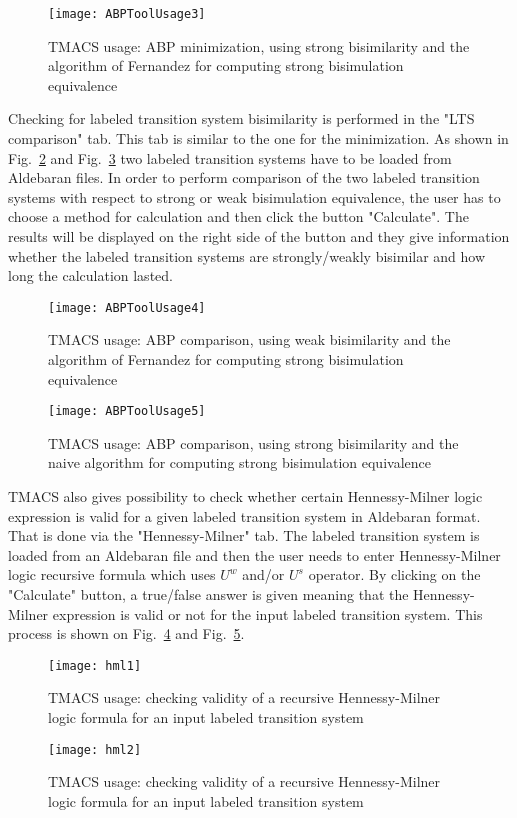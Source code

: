 \begin{figure}[h]
\centering
\texttt{[image: ABPToolUsage3]}
\caption{TMACS usage: ABP minimization, using strong bisimilarity and the algorithm of Fernandez for computing strong bisimulation equivalence}
\label{fig:abptoolusage3}
\end{figure}

Checking for labeled transition system bisimilarity is performed in the "LTS comparison" tab. This tab is 
similar to the one for the minimization. As shown in Fig.~\ref{fig:abptoolusage4} and
Fig.~\ref{fig:abptoolusage5} two labeled transition systems have to be loaded from Aldebaran files. In order to perform comparison of the two labeled transition systems with respect to strong or weak bisimulation equivalence, the user has to choose a method for calculation and then click the button 
"Calculate". The results will be displayed on the right side of the button and they
give information whether the labeled transition systems are strongly/weakly bisimilar and how long the calculation lasted.

\begin{figure}[!ht]
\centering
\texttt{[image: ABPToolUsage4]}
\caption{TMACS usage: ABP comparison, using weak bisimilarity and the algorithm of Fernandez for computing strong bisimulation equivalence}
\label{fig:abptoolusage4}
\end{figure}

\begin{figure}[!ht]
\centering
\texttt{[image: ABPToolUsage5]}
\caption{TMACS usage: ABP comparison, using strong bisimilarity and the naive algorithm for computing strong bisimulation equivalence}
\label{fig:abptoolusage5}
\end{figure}

TMACS also gives possibility to check whether certain Hennessy-Milner logic expression is valid for a given labeled transition system in Aldebaran format. That is done via the "Hennessy-Milner" tab. The labeled transition system is loaded from an Aldebaran file and then the user needs to enter Hennessy-Milner logic recursive formula which uses $U^{w}$ and/or $U^{s}$ operator. By clicking on the "Calculate" button, a true/false answer is given meaning that the Hennessy-Milner expression is valid or not for the input labeled transition system. This process is shown on Fig.~\ref{fig:hml1} and Fig.~\ref{fig:hml2}.

\begin{figure}[!ht]
\centering
\texttt{[image: hml1]}
\caption{TMACS usage: checking validity of a recursive Hennessy-Milner logic formula for an input labeled transition system}
\label{fig:hml1}
\end{figure}

\begin{figure}[!ht]
\centering
\texttt{[image: hml2]}
\caption{TMACS usage: checking validity of a recursive Hennessy-Milner logic formula for an input labeled transition system}
\label{fig:hml2}
\end{figure}